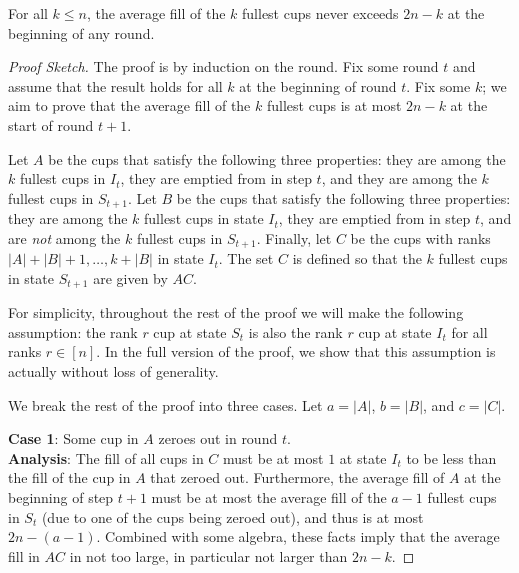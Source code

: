 \begin{theorem}
  \label{thm:TO_invariant}
 For all $k \le n$, the average fill of the $k$ fullest cups never exceeds $2n-k$ at the beginning of any round.
\end{theorem}
\begin{proof}[Proof Sketch]
 The proof is by induction on the round. Fix some
round $t$ and assume that the result holds for all $k$ at the beginning of round $t$. Fix
some $k$; we aim to prove that the average fill of the $k$
fullest cups is at most $2n-k$ at the start of round $t+1$. 

Let $A$ be the cups that satisfy the following three properties: they
are among the $k$ fullest cups in $I_t$, they are emptied from in step
$t$, and they are among the $k$ fullest cups in $S_{t+1}$. Let $B$ be
the cups that satisfy the following three properties: they are among
the $k$ fullest cups in state $I_t$, they are emptied from in step
$t$, and are \emph{not} among the $k$ fullest cups in
$S_{t+1}$. Finally, let $C$ be the cups with ranks
$|A| + |B| + 1, \ldots, k + |B|$ in state $I_t$. The set $C$ is
defined so that the $k$ fullest cups in state $S_{t+1}$ are given by $AC$.

For simplicity, throughout the rest of the proof we will make the
following assumption: the rank $r$ cup at state $S_t$ is also the rank
$r$ cup at state $I_t$ for all ranks $r \in [n]$. In the full version
of the proof, we show that this assumption is
actually without loss of generality.


We break the rest of the proof into three cases. Let $a = |A|$,
$b = |B|$, and $c = |C|$. 

\vspace{.3 cm}

\noindent\textbf{Case 1}:
Some cup in $A$ zeroes out in round $t$.\\
\textbf{Analysis}: The fill of all cups in $C$ must be at most $1$ at
state $I_t$ to be less than the fill of the cup in $A$ that zeroed
out. Furthermore, the average fill of $A$ at the beginning of step
$t + 1$ must be at most the average fill of the $a - 1$ fullest cups
in $S_t$ (due to one of the cups being zeroed out), and thus is at
most $2n-(a - 1)$. Combined with some algebra, these facts imply
that the average fill in $AC$ in  not too large, in particular not
larger than $2n-k$.

\vspace{.3 cm}


\end{proof}
